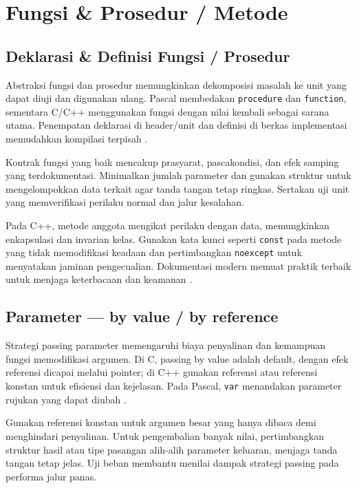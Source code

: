 \documentclass[../main.tex]{subfiles}
\begin{document}
\chapter{Fungsi \& Prosedur / Metode}
\section{Deklarasi \& Definisi Fungsi / Prosedur}
Abstraksi fungsi dan prosedur memungkinkan dekomposisi masalah ke unit yang dapat diuji dan digunakan ulang. Pascal membedakan \texttt{procedure} dan \texttt{function}, sementara C/C++ menggunakan fungsi dengan nilai kembali sebagai sarana utama. Penempatan deklarasi di header/unit dan definisi di berkas implementasi memudahkan kompilasi terpisah \parencite{pascal-procedure-function,c-functions,cpp-functions}.

Kontrak fungsi yang baik mencakup prasyarat, pascakondisi, dan efek samping yang terdokumentasi. Minimalkan jumlah parameter dan gunakan struktur untuk mengelompokkan data terkait agar tanda tangan tetap ringkas. Sertakan uji unit yang memverifikasi perilaku normal dan jalur kesalahan.

Pada C++, metode anggota mengikat perilaku dengan data, memungkinkan enkapsulasi dan invarian kelas. Gunakan kata kunci seperti \texttt{const} pada metode yang tidak memodifikasi keadaan dan pertimbangkan \texttt{noexcept} untuk menyatakan jaminan pengecualian. Dokumentasi modern memuat praktik terbaik untuk menjaga keterbacaan dan keamanan \parencite{cpp-functions,cpp-reference}.

\section{Parameter — by value / by reference}
Strategi passing parameter memengaruhi biaya penyalinan dan kemampuan fungsi memodifikasi argumen. Di C, passing by value adalah default, dengan efek referensi dicapai melalui pointer; di C++ gunakan referensi atau referensi konstan untuk efisiensi dan kejelasan. Pada Pascal, \texttt{var} menandakan parameter rujukan yang dapat diubah \parencite{gnu-c-manual,free-pascal-docs}.

Gunakan referensi konstan untuk argumen besar yang hanya dibaca demi menghindari penyalinan. Untuk pengembalian banyak nilai, pertimbangkan struktur hasil atau tipe pasangan alih-alih parameter keluaran, menjaga tanda tangan tetap jelas. Uji beban membantu menilai dampak strategi passing pada performa jalur panas.
\end{document}
